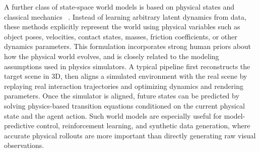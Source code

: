 A further class of state-space world models is based on physical states and classical mechanics ~\cite{li2025pinwm,jiang2025phystwin,wang2025embodiedreamer,wang2025contactgaussianwm}. Instead of learning arbitrary latent dynamics from data, these methods explicitly represent the world using physical variables such as object poses, velocities, contact states, masses, friction coefficients, or other dynamics parameters. This formulation incorporates strong human priors about how the physical world evolves, and is closely related to the modeling assumptions used in physics simulators. A typical pipeline first reconstructs the target scene in 3D, then aligns a simulated environment with the real scene by replaying real interaction trajectories and optimizing dynamics and rendering parameters. Once the simulator is aligned, future states can be predicted by solving physics-based transition equations conditioned on the current physical state and the agent action. Such world models are especially useful for model-predictive control, reinforcement learning, and synthetic data generation, where accurate physical rollouts are more important than directly generating raw visual observations.


